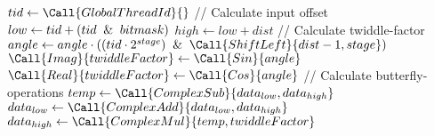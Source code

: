 	\State $tid \gets \Call{GlobalThreadId}{}$
	\newline
	\State // Calculate input offset          
	\State $low \gets tid + (tid \And bitmask)$
	\State $high \gets low + dist$            
	\newline
	\State // Calculate twiddle-factor
	\State $angle \gets angle \cdot ((tid \cdot 2^{stage}) \And \Call{ShiftLeft}{dist - 1, stage})$
	\State $\Call{Imag}{twiddleFactor} \gets \Call{Sin}{angle}$
	\State $\Call{Real}{twiddleFactor} \gets \Call{Cos}{angle}$
	\newline
	\State // Calculate butterfly-operations
	\State $temp \gets \Call{ComplexSub}{data_{low}, data_{high}}$
	\State $data_{low} \gets \Call{ComplexAdd}{data_{low}, data_{high}}$
	\State $data_{high} \gets \Call{ComplexMul}{temp, twiddleFactor}$
\EndProcedure
